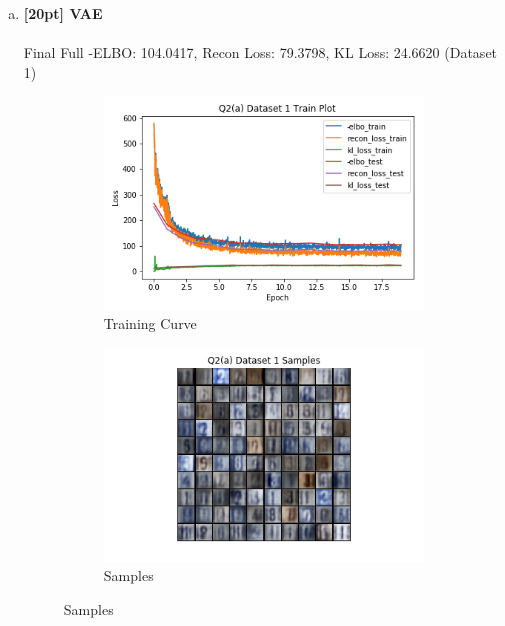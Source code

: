 \documentclass{article}
\begin{document}
\begin{enumerate}[(a)]
  \item {\bf [20pt] VAE} \\\\
  Final Full -ELBO: 104.0417, Recon Loss: 79.3798, KL Loss: 24.6620 (Dataset 1)
  \begin{figure}[H]
         \centering
         \begin{subfigure}[b]{0.475\textwidth}
             \centering
             \includegraphics[width=\textwidth]{figures/q2_a_dset1_train_plot.png}
             \caption{Training Curve}
         \end{subfigure}
         \hfill
         \begin{subfigure}[b]{0.475\textwidth}
             \centering
             \includegraphics[width=\textwidth]{figures/q2_a_dset1_samples.png}
             \caption{Samples}
         \end{subfigure}

\end{figure}
\end{enumerate}
\end{document}
